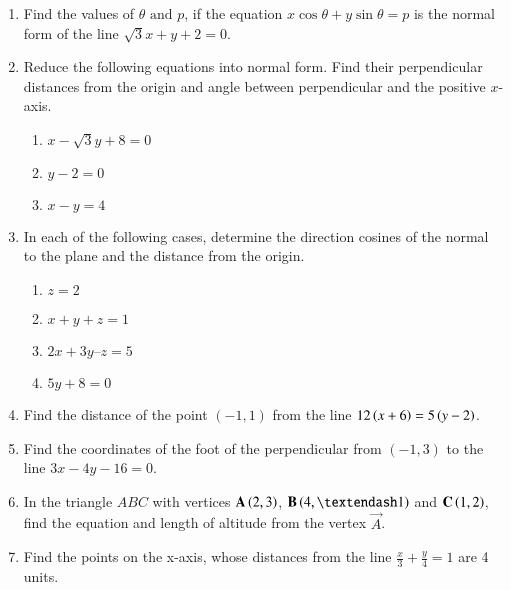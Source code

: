\begin{enumerate}[label=\thesubsection.\arabic*, ref=\thesubsection.\theenumi]
	\item Find the values of $\theta \text{ and } p$,  if the equation $x\cos\theta+y\sin\theta=p$ is the normal form
of the line $\sqrt{3}x+y+2=0$.
\\
\solution
		
\item  Reduce the following equations into normal form. Find their perpendicular distances from the origin and angle between perpendicular and the positive $x$-axis.
\label{chapters/11/10/3/3}
\begin{enumerate}
	\item $x-\sqrt{3}y+8=0$ 
	\item $y-2=0$
	\item $x-y=4$
\end{enumerate}
\solution

 \item  In each of the following cases,  determine the direction cosines of the normal to
the plane and the distance from the origin.
\begin{enumerate}
	\item $z=2$ 
	\item $x + y + z = 1$
	\item $2x + 3y – z = 5$
	\item $5y + 8 = 0$
\end{enumerate}
    \solution
		
\item Find the distance of the point $(-1, 1)$ from the line $12\left(x+6\right) = 5\left(y-2\right)$. 
\label{chapters/11/10/3/4}
	\\
\solution 

\item Find the coordinates of the foot of the perpendicular from $(-1,  3)$ to the line $3x-4y-16=0$.  
\label{chapters/11/10/3/14}
\\
\solution

\item In the triangle $ABC$ with vertices $\mathbf{A} \left(2,  3\right)$,  $\vec{B} \brak{4,  –1}$ and $\mathbf{C} \left(1,  2\right)$,  find the equation and length of altitude from the vertex $\vec{A}$.
\label{chapters/11/10/3/17}
\\
\solution

\item Find the points on the x-axis,  whose distances from the line $\frac{x}{3}+\frac{y}{4}=1$ are 4 units.
\label{chapters/11/10/3/5}
	\\

\end{enumerate}
